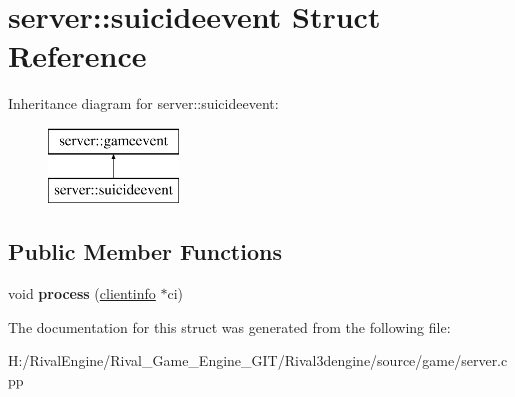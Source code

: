 \hypertarget{structserver_1_1suicideevent}{}\section{server\+:\+:suicideevent Struct Reference}
\label{structserver_1_1suicideevent}
Inheritance diagram for server\+:\+:suicideevent\+:\begin{figure}[H]
\begin{center}
\leavevmode
\includegraphics[height=2.000000cm]{structserver_1_1suicideevent}
\end{center}
\end{figure}
\subsection*{Public Member Functions}
\begin{DoxyCompactItemize}
\item 
\mbox{\label{structserver_1_1suicideevent_a8cc91f20b88cfa0592e35f3feac5bec5}} 
void {\bfseries process} (\hyperlink{structserver_1_1clientinfo}{clientinfo} $\ast$ci)
\end{DoxyCompactItemize}


The documentation for this struct was generated from the following file\+:\begin{DoxyCompactItemize}
\item 
H\+:/\+Rival\+Engine/\+Rival\+\_\+\+Game\+\_\+\+Engine\+\_\+\+G\+I\+T/\+Rival3dengine/source/game/server.\+cpp\end{DoxyCompactItemize}
